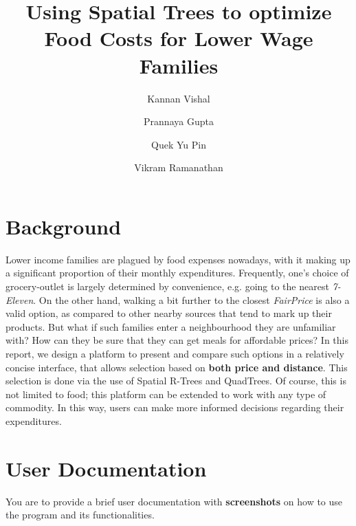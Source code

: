 \documentclass[12pt]{article}
\begin{document}
\pagestyle{fancy}
\fancyhf{}



{\selectfont
\title{
	\huge \textbf{Using Spatial Trees to optimize Food Costs for Lower Wage Families}
}

\date{}

\author[1]{Kannan Vishal}
\author[1]{Prannaya Gupta}
\author[1]{Quek Yu Pin}
\author[1]{Vikram Ramanathan}

\maketitle

\vspace{-2cm}

\tableofcontents

\thispagestyle{empty}
\newpage

\section{Background}

Lower income families are plagued by food expenses nowadays, with it making up a significant proportion of their monthly expenditures. Frequently, one's choice of grocery-outlet is largely determined by convenience, e.g. going to the nearest \textit{7-Eleven}. On the other hand, walking a bit further to the closest \textit{FairPrice} is also a valid option, as compared to other nearby sources that tend to mark up their products. But what if such families enter a neighbourhood they are unfamiliar with? How can they be sure that they can get meals for affordable prices? In this report, we design a platform to present and compare such options in a relatively concise interface, that allows selection based on \textbf{both price and distance}. This selection is done via the use of Spatial R-Trees and QuadTrees. Of course, this is not limited to food; this platform can be extended to work with any type of commodity. In this way, users can make more informed decisions regarding their expenditures.
    
   
\section{User Documentation}
You are to provide a brief user documentation with \textbf{screenshots} on how to use the
program and its functionalities.

}
\end{document}

